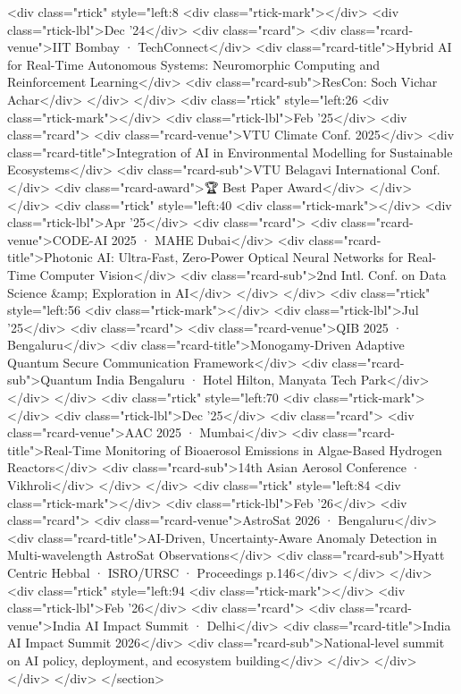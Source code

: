       <div class="rtick" style="left:8%
        <div class="rtick-mark"></div>
        <div class="rtick-lbl">Dec '24</div>
        <div class="rcard">
          <div class="rcard-venue">IIT Bombay · TechConnect</div>
          <div class="rcard-title">Hybrid AI for Real-Time Autonomous Systems: Neuromorphic Computing and Reinforcement Learning</div>
          <div class="rcard-sub">ResCon: Soch Vichar Achar</div>
        </div>
      </div>
      <div class="rtick" style="left:26%
        <div class="rtick-mark"></div>
        <div class="rtick-lbl">Feb '25</div>
        <div class="rcard">
          <div class="rcard-venue">VTU Climate Conf. 2025</div>
          <div class="rcard-title">Integration of AI in Environmental Modelling for Sustainable Ecosystems</div>
          <div class="rcard-sub">VTU Belagavi International Conf.</div>
          <div class="rcard-award">🏆 Best Paper Award</div>
        </div>
      </div>
      <div class="rtick" style="left:40%
        <div class="rtick-mark"></div>
        <div class="rtick-lbl">Apr '25</div>
        <div class="rcard">
          <div class="rcard-venue">CODE-AI 2025 · MAHE Dubai</div>
          <div class="rcard-title">Photonic AI: Ultra-Fast, Zero-Power Optical Neural Networks for Real-Time Computer Vision</div>
          <div class="rcard-sub">2nd Intl. Conf. on Data Science &amp; Exploration in AI</div>
        </div>
      </div>
      <div class="rtick" style="left:56%
        <div class="rtick-mark"></div>
        <div class="rtick-lbl">Jul '25</div>
        <div class="rcard">
          <div class="rcard-venue">QIB 2025 · Bengaluru</div>
          <div class="rcard-title">Monogamy-Driven Adaptive Quantum Secure Communication Framework</div>
          <div class="rcard-sub">Quantum India Bengaluru · Hotel Hilton, Manyata Tech Park</div>
        </div>
      </div>
      <div class="rtick" style="left:70%
        <div class="rtick-mark"></div>
        <div class="rtick-lbl">Dec '25</div>
        <div class="rcard">
          <div class="rcard-venue">AAC 2025 · Mumbai</div>
          <div class="rcard-title">Real-Time Monitoring of Bioaerosol Emissions in Algae-Based Hydrogen Reactors</div>
          <div class="rcard-sub">14th Asian Aerosol Conference · Vikhroli</div>
        </div>
      </div>
      <div class="rtick" style="left:84%
        <div class="rtick-mark"></div>
        <div class="rtick-lbl">Feb '26</div>
        <div class="rcard">
          <div class="rcard-venue">AstroSat 2026 · Bengaluru</div>
          <div class="rcard-title">AI-Driven, Uncertainty-Aware Anomaly Detection in Multi-wavelength AstroSat Observations</div>
          <div class="rcard-sub">Hyatt Centric Hebbal · ISRO/URSC · Proceedings p.146</div>
        </div>
      </div>
      <div class="rtick" style="left:94%
        <div class="rtick-mark"></div>
        <div class="rtick-lbl">Feb '26</div>
        <div class="rcard">
          <div class="rcard-venue">India AI Impact Summit · Delhi</div>
          <div class="rcard-title">India AI Impact Summit 2026</div>
          <div class="rcard-sub">National-level summit on AI policy, deployment, and ecosystem building</div>
        </div>
      </div>
    </div>
  </div>
</section>


